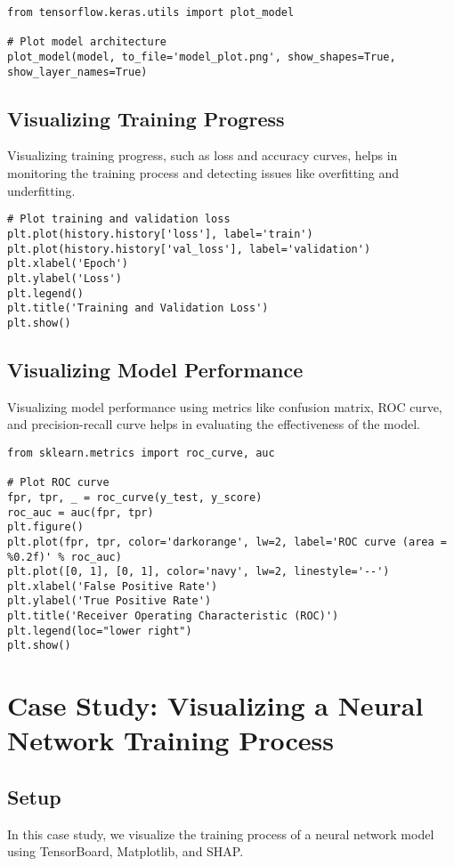 \begin{verbatim}
from tensorflow.keras.utils import plot_model

# Plot model architecture
plot_model(model, to_file='model_plot.png', show_shapes=True, show_layer_names=True)
\end{verbatim}

\subsection{Visualizing Training Progress}
Visualizing training progress, such as loss and accuracy curves, helps in monitoring the training process and detecting issues like overfitting and underfitting.

\begin{verbatim}
# Plot training and validation loss
plt.plot(history.history['loss'], label='train')
plt.plot(history.history['val_loss'], label='validation')
plt.xlabel('Epoch')
plt.ylabel('Loss')
plt.legend()
plt.title('Training and Validation Loss')
plt.show()
\end{verbatim}

\subsection{Visualizing Model Performance}
Visualizing model performance using metrics like confusion matrix, ROC curve, and precision-recall curve helps in evaluating the effectiveness of the model.

\begin{verbatim}
from sklearn.metrics import roc_curve, auc

# Plot ROC curve
fpr, tpr, _ = roc_curve(y_test, y_score)
roc_auc = auc(fpr, tpr)
plt.figure()
plt.plot(fpr, tpr, color='darkorange', lw=2, label='ROC curve (area = %0.2f)' % roc_auc)
plt.plot([0, 1], [0, 1], color='navy', lw=2, linestyle='--')
plt.xlabel('False Positive Rate')
plt.ylabel('True Positive Rate')
plt.title('Receiver Operating Characteristic (ROC)')
plt.legend(loc="lower right")
plt.show()
\end{verbatim}

\section{Case Study: Visualizing a Neural Network Training Process}

\subsection{Setup}
In this case study, we visualize the training process of a neural network model using TensorBoard, Matplotlib, and SHAP.

